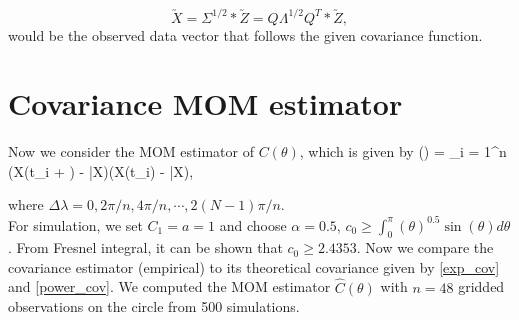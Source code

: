 %
%

\[
	\utilde{X} = \Sigma^{1/2}*\utilde{Z} = Q\Lambda^{1/2}Q^T*\utilde{Z},
\]
would be the observed data vector that follows the given covariance function.

\section{Covariance MOM estimator}


Now we consider the MOM estimator of $C(\theta)$, which is given by
\beq \label{covarince_estimator}
(\Delta \lambda) = \sum_{i = 1}^n (X(t_i + \Delta \lambda) - \bar{X})(X(t_i) - \bar{X}),
\eeq

\noi where $\Delta \lambda = 0, 2\pi/n, 4\pi/n, \cdots, 2(N-1)\pi/n$. \\

For simulation, we set $C_1 = a = 1$ and choose $\alpha = 0.5$, $c_0 \ge \int_0^\pi(\theta)^{0.5} \sin(\theta) d\theta$. From Fresnel integral, it can be shown that $c_0 \ge 2.4353$. Now we compare the covariance estimator (empirical) to its theoretical covariance given by \eqref{exp_cov} and \eqref{power_cov}. We computed the MOM estimator $\hat{C}(\theta)$ with $n = 48$ gridded observations on the circle from 500 simulations.

